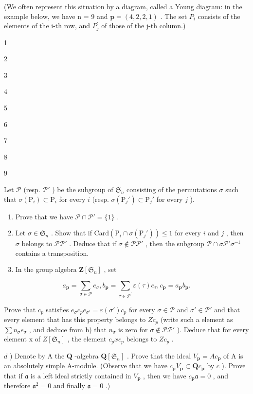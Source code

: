 (We often represent this situation by a diagram, called a Young diagram: in the example below, we have n = 9 and \(\mathbf{p} = (4, 2, 2, 1)\) . The set \(P_{i}\) consists of the elements of the i-th row, and \(P_{j}^{\prime}\) of those of the j-th column.)

1

2

3

4

5

6

7

8

9

Let \(\mathcal{P}\) (resp. \(\mathcal{P}'\) ) be the subgroup of \(\mathfrak{S}_n\) consisting of the permutations \(\sigma\) such that \(\sigma(\mathrm{P}_i) \subset \mathrm{P}_i\) for every \(i\) (resp. \(\sigma(\mathrm{P}_j') \subset \mathrm{P}_j'\) for every \(j\) ).

\begin{enumerate}
\def\labelenumi{\alph{enumi})}
\item
  Prove that we have \(\mathcal{P} \cap \mathcal{P}' = \{1\}\) .
\item
  Let \(\sigma \in \mathfrak{S}_n\) . Show that if \(\mathrm{Card}(\mathrm{P}_i \cap \sigma(\mathrm{P}_j')) \leqslant 1\) for every \(i\) and \(j\) , then \(\sigma\) belongs to \(\mathcal{PP}'\) . Deduce that if \(\sigma \notin \mathcal{PP}'\) , then the subgroup \(\mathcal{P} \cap \sigma \mathcal{P}'\sigma^{-1}\) contains a transposition.
\item
  In the group algebra \(\mathbf{Z}[\mathfrak{S}_n]\) , set
\end{enumerate}

\[
a _ {\mathbf {p}} = \sum_ {\sigma \in \mathcal {P}} e _ {\sigma}, b _ {\mathbf {p}} = \sum_ {\tau \in \mathcal {P} ^ {\prime}} \varepsilon (\tau) e _ {\tau}, c _ {\mathbf {p}} = a _ {\mathbf {p}} b _ {\mathbf {p}}.
\]

Prove that \(c_{p}\) satisfies \(e_{\sigma}c_{p}e_{\sigma'}=\varepsilon(\sigma')c_{p}\) for every \(\sigma\in \mathcal{P}\) and \(\sigma'\in \mathcal{P}'\) and that every element that has this property belongs to \(Zc_{p}\) (write such a element as \(\sum n_{\sigma}e_{\sigma}\) , and deduce from b) that \(n_{\sigma}\) is zero for \(\sigma\notin \mathcal{P}\mathcal{P}'\) ). Deduce that for every element x of \(Z[\mathfrak{S}_n]\) , the element \(c_{p}xc_{p}\) belongs to \(Zc_{p}\) .

\(d\) ) Denote by A the \(\mathbf{Q}\) -algebra \(\mathbf{Q}[\mathfrak{S}_n]\) . Prove that the ideal \(V_{\mathbf{p}} = Ac_{\mathbf{p}}\) of A is an absolutely simple A-module. (Observe that we have \(c_{\mathbf{p}}V_{\mathbf{p}} \subset \mathbf{Q}c_{\mathbf{p}}\) by \(c\) ). Prove that if \(\mathfrak{a}\) is a left ideal strictly contained in \(V_{\mathbf{p}}\) , then we have \(c_{\mathbf{p}}\mathfrak{a} = 0\) , and therefore \(\mathfrak{a}^2 = 0\) and finally \(\mathfrak{a} = 0\) .)

